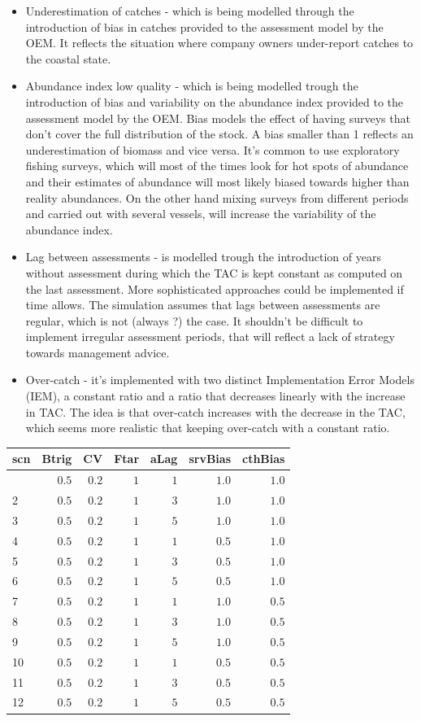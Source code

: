 \documentclass[a4paper]{article}
\begin{document}
\begin{itemize}
	\item Underestimation of catches - which is being modelled through the introduction of bias in catches provided to the assessment model by the OEM. It reflects the situation where company owners under-report catches to the coastal state. 
	\item Abundance index low quality - which is being modelled trough the introduction of bias and variability on the abundance index provided to the assessment model by the OEM. Bias models the effect of having surveys that don't cover the full distribution of the stock. A bias smaller than 1 reflects an underestimation of biomass and vice versa. It's common to use exploratory fishing surveys, which will most of the times look for hot spots of abundance and their estimates of abundance will most likely biased towards higher than reality abundances. On the other hand mixing surveys from different periods and carried out with several vessels, will increase the variability of the abundance index. 
	\item Lag between assessments - is modelled trough the introduction of years without assessment during which the TAC is kept constant as computed on the last assessment. More sophisticated approaches could be implemented if time allows. The simulation assumes that lags between assessments are regular, which is not (always ?) the case. It shouldn't be difficult to implement irregular assessment periods, that will reflect a lack of strategy towards management advice.
	\item Over-catch - it's implemented with two distinct Implementation Error Models (IEM), a constant ratio and a ratio that decreases linearly with the increase in TAC. The idea is that over-catch increases with the decrease in the TAC, which seems more realistic that keeping over-catch with a constant ratio.  
\end{itemize}     

\begin{table}[h]
\caption{Simulation scenarios}
%

\setlongtables


\begin{longtable}{lrrrrrr}
\hline
\multicolumn{1}{l}{scn}&\multicolumn{1}{c}{Btrig}&\multicolumn{1}{c}{CV}&\multicolumn{1}{c}{Ftar}&\multicolumn{1}{c}{aLag}&\multicolumn{1}{c}{srvBias}&\multicolumn{1}{c}{cthBias}\tabularnewline
\hline
\endhead
\hline
\endfoot
1&$0.5$&$0.2$&$1$&$1$&$1.0$&$1.0$\tabularnewline
2&$0.5$&$0.2$&$1$&$3$&$1.0$&$1.0$\tabularnewline
3&$0.5$&$0.2$&$1$&$5$&$1.0$&$1.0$\tabularnewline
4&$0.5$&$0.2$&$1$&$1$&$0.5$&$1.0$\tabularnewline
5&$0.5$&$0.2$&$1$&$3$&$0.5$&$1.0$\tabularnewline
6&$0.5$&$0.2$&$1$&$5$&$0.5$&$1.0$\tabularnewline
7&$0.5$&$0.2$&$1$&$1$&$1.0$&$0.5$\tabularnewline
8&$0.5$&$0.2$&$1$&$3$&$1.0$&$0.5$\tabularnewline
9&$0.5$&$0.2$&$1$&$5$&$1.0$&$0.5$\tabularnewline
10&$0.5$&$0.2$&$1$&$1$&$0.5$&$0.5$\tabularnewline
11&$0.5$&$0.2$&$1$&$3$&$0.5$&$0.5$\tabularnewline
12&$0.5$&$0.2$&$1$&$5$&$0.5$&$0.5$\tabularnewline
\hline
\end{longtable}\end{table}
\end{document}
